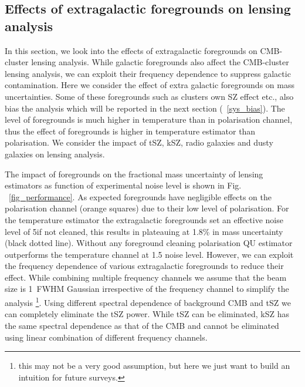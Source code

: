    \subsection{Effects of extragalactic foregrounds on lensing analysis}
   In this section, we look into the effects of extragalactic foregrounds on CMB-cluster lensing analysis. While galactic foregrounds also affect the CMB-cluster lensing analysis, we can exploit their frequency dependence to suppress galactic contamination. Here we consider the effect of extra galactic foregrounds on mass uncertainties. Some of these foregrounds such as clusters own SZ effect etc., also bias the analysis which will be reported in the next section (~\ref{sys_bias}). The level of foregrounds is much higher in temperature than in polarisation channel, thus the effect of foregrounds is higher in temperature estimator than polarisation. We consider the impact of tSZ, kSZ, radio galaxies and dusty galaxies on lensing analysis.
   
   The impact of foregrounds on the fractional mass uncertainty of lensing estimators as function of experimental noise level is shown in Fig. ~\ref{fig_performance}. 
   As expected foregrounds have negligible effects on the polarisation channel (orange squares) due to their low level of polarisation.
   For the temperature estimator the extragalactic foregrounds set an effective noise level of 5\ukam if not cleaned, this results in plateauing at 1.8\% in mass uncertainty (black dotted line). 
   Without any foreground cleaning polarisation QU estimator outperforms the temperature channel at 1.5 \ukam noise level.
 However, we can exploit the frequency dependence of various extragalactic foregrounds to reduce their effect.
 While combining multiple frequency channels we assume that the beam size is 1\am\ FWHM Gaussian irrespective of the frequency channel to simplify the analysis \footnote{ this may not be a very good assumption, but here we just want to build an intuition for future surveys.}. 
Using different spectral dependence of background CMB and tSZ we can completely eliminate the tSZ power.
While tSZ can be eliminated, kSZ has the same spectral dependence as that of the CMB and cannot be eliminated using linear combination of different frequency channels.
 

